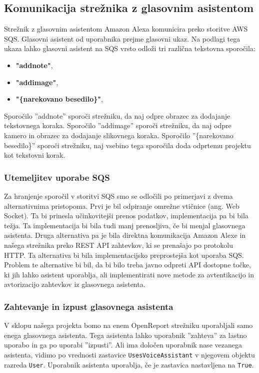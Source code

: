 \documentclass[a4paper, 12pt]{book}
\begin{document}
\subsection{Komunikacija strežnika z glasovnim asistentom}

Strežnik z glasovnim asistentom Amazon Alexa komunicira preko storitve AWS SQS.
Glasovni asistent od uporabnika prejme glasovni ukaz.
Na podlagi tega ukaza lahko glasovni asistent na SQS vrsto odloži tri različna tekstovna sporočila:
\begin{itemize}
	\item \textbf{"addnote"},
	\item \textbf{"addimage"},
	\item \textbf{"\{narekovano besedilo\}"},
\end{itemize}

Sporočilo ''addnote'' sporoči strežniku, da naj odpre obrazec za dodajanje tekstovnega koraka.
Sporočilo ''addimage'' sporoči strežniku, da naj odpre kamero in obrazec za dodajanje slikovnega koraka.
Sporočilo ''\{narekovano besedilo\}'' sporoči strežniku, naj vsebino tega sporočila doda odprtemu projektu kot tekstovni korak.

\subsubsection{Utemeljitev uporabe SQS}
Za hranjenje sporočil v storitvi SQS smo se odločili po primerjavi z dvema alternativnima pristopoma.
Prvi je bil odpiranje omrežne vtičnice (ang. Web Socket).
Ta bi prinesla učinkovitejši prenos podatkov, implementacija pa bi bila težja.
Ta implementacija bi bila tudi manj prenosljiva, če bi menjal glasovnega asistenta.
Druga alternativa pa je bila direktna komunikacija Amazon Alexe in našega strežnika preko REST API zahtevkov, ki se prenašajo po protokolu HTTP.
Ta alternativa bi bila implementacijsko preprostejša kot uporaba SQS.
Problem te alternative bi bil, da bi bilo treba javno odpreti API dostopne točke, ki jih lahko asistent uporablja, ali implementirati nove metode za avtentikacijo in avtorizacijo zahtevkov iz glasovnega asistenta.

\subsubsection{Zahtevanje in izpust glasovnega asistenta}

V sklopu našega projekta bomo na enem OpenReport strežniku uporabljali samo enega glasovnega asistenta.
Tega asistenta lahko uporabnik ''zahteva'' za lastno uporabo in ga po uporabi ''izpusti''.
Ali ima določen uporabnik nase vezanega asistenta, vidimo po vrednosti zastavice \texttt{UsesVoiceAssistant} v njegovem objektu razreda \texttt{User}.
Uporabnik asistenta uporablja, če je zastavica nastavljena na \texttt{True}.
\end{document}
